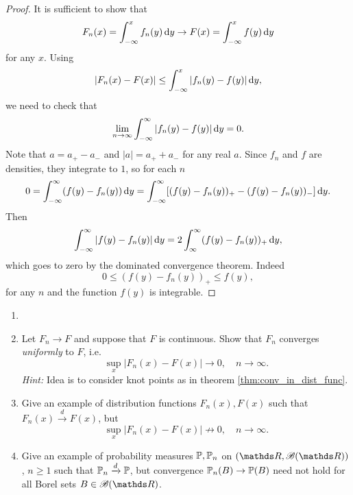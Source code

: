 \begin{proof}
It is sufficient to show that 
\begin{equation*}
    F_n(x) = \int_{-\infty}^x f_n(y) \, \mathrm{d} y \to F(x) = \int_{-\infty}^x f(y) \, \mathrm{d} y
\end{equation*}
for any $x$. Using 
\begin{equation*}
    |F_n(x) - F(x)| \le \int_{-\infty}^x |f_n(y) - f(y)| \, \mathrm{d} y,
\end{equation*}
we need to check that
\begin{equation*}
    \lim_{n \to \infty} \int_{-\infty}^\infty |f_n(y) - f(y)| \, \mathrm{d} y = 0.
\end{equation*}
Note that $a = a_+ - a_-$ and $|a| = a_+ + a_-$ for any real $a$. Since $f_n$ and $f$ are densities, they integrate to $1$, so for each $n$
\begin{equation*}
    0 = \int_{-\infty}^\infty (f(y) - f_n(y)) \, \mathrm{d} y = \int_{-\infty}^\infty [(f(y) - f_n(y))_+ - (f(y) - f_n(y))_-] \, \mathrm{d} y.
\end{equation*}
Then
\begin{equation*}
    \int_{-\infty}^\infty |f(y) - f_n(y)| \, \mathrm{d} y = 2\int_{\infty}^\infty(f(y) - f_n(y))_+ \, \mathrm{d} y,
\end{equation*}
which goes to zero by the dominated convergence theorem. Indeed 
\begin{equation*}
    0 \le (f(y) - f_n(y))_+ \le f(y),
\end{equation*}
for any $n$ and the function $f(y)$ is integrable.
\end{proof}

\begin{exercise} \label{ex:uniform_conv_of_dist}
\begin{enumerate}
    \item[]
    \item Let $F_n \to F$ and suppose that $F$ is continuous. Show that $F_n$ converges \textit{uniformly} to $F$, i.e.
    \begin{equation*}
        \sup_x |F_n(x) - F(x)| \to 0, \quad n \to \infty.
    \end{equation*}
    \textit{Hint:} Idea is to consider knot points as in theorem \ref{thm:conv_in_dist_func}.
    \item Give an example of distribution functions $F_n(x), F(x)$ such that $F_n(x) \xrightarrow{d} F(x)$, but 
    \begin{equation*}
        \sup_x |F_n(x) - F(x)| \not \to 0, \quad n \to \infty.
    \end{equation*}
    \item Give an example of probability measures $\mathbb{P}, \mathbb{P}_n$ on $(\R, \B(\R))$, $n \ge 1$ such that $\mathbb{P}_n \xrightarrow{d} \mathbb{P}$, but convergence $\mathbb{P}_n(B) \to \mathbb{P}(B)$ need not hold for all Borel sets $B \in \B(\R)$.
\end{enumerate}
\end{exercise}

